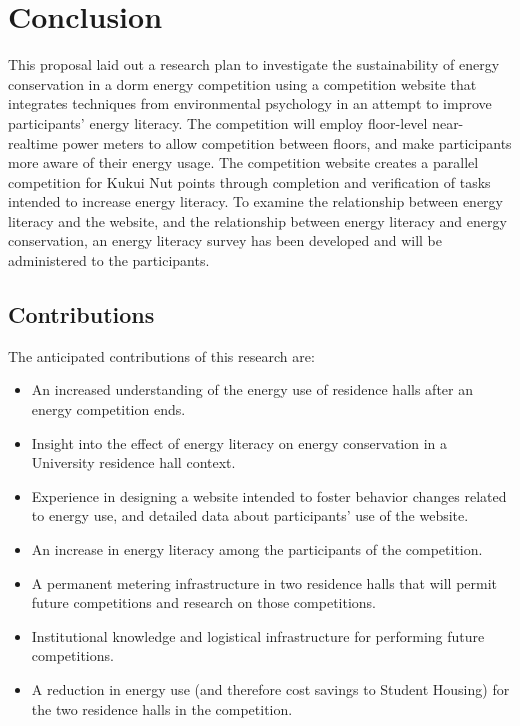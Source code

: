 \chapter{Conclusion}
\label{cha:conclusion}

This proposal laid out a research plan to investigate the sustainability of energy conservation in a dorm energy competition using a competition website that integrates techniques from environmental psychology in an attempt to improve participants' energy literacy. The competition will employ floor-level near-realtime power meters to allow competition between floors, and make participants more aware of their energy usage. The competition website creates a parallel competition for Kukui Nut points through completion and verification of tasks intended to increase energy literacy. To examine the relationship between energy literacy and the website, and the relationship between energy literacy and energy conservation, an energy literacy survey has been developed and will be administered to the participants.

\section{Contributions}

The anticipated contributions of this research are:

\begin{itemize}
	\item An increased understanding of the energy use of residence halls after an energy competition ends.
	\item Insight into the effect of energy literacy on energy conservation in a University residence hall context.
	\item Experience in designing a website intended to foster behavior changes related to energy use, and detailed data about participants' use of the website.
	\item An increase in energy literacy among the participants of the competition.
	\item A permanent metering infrastructure in two residence halls that will permit future competitions and research on those competitions.
	\item Institutional knowledge and logistical infrastructure for performing future competitions.
	\item A reduction in energy use (and therefore cost savings to Student Housing) for the two residence halls in the competition.
\end{itemize}

